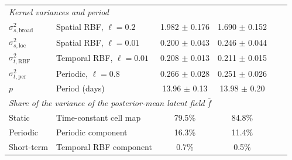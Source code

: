 \begin{table}[t]
\begin{tabular}{llcccc}
\midrule
\multicolumn{6}{l}{\textit{Kernel variances and period}} \\
$\sigma^2_{s,\mathrm{broad}}$ & Spatial RBF, $\ell=0.2$ & 1.982 $\pm$ 0.176 & 1.690 $\pm$ 0.152 & & \\
$\sigma^2_{s,\mathrm{loc}}$ & Spatial RBF, $\ell=0.01$ & 0.200 $\pm$ 0.043 & 0.246 $\pm$ 0.044 & & \\
$\sigma^2_{t,\mathrm{RBF}}$ & Temporal RBF, $\ell=0.01$ & 0.208 $\pm$ 0.013 & 0.211 $\pm$ 0.015 & & \\
$\sigma^2_{t,\mathrm{per}}$ & Periodic, $\ell=0.8$ & 0.266 $\pm$ 0.028 & 0.251 $\pm$ 0.026 & & \\
$p$ & Period (days) & 13.96 $\pm$ 0.13 & 13.98 $\pm$ 0.20 & & \\
\midrule
\multicolumn{6}{l}{\textit{Share of the variance of the posterior-mean latent field} $\bar f$} \\
Static & Time-constant cell map & 79.5\% & 84.8\% & & \\
Periodic & Periodic component & 16.3\% & 11.4\% & & \\
Short-term & Temporal RBF component & 0.7\% & 0.5\% & & \\
\bottomrule
\end{tabular}
\end{table}
